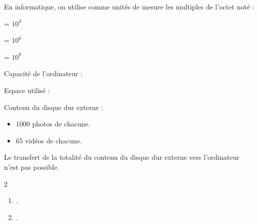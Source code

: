 \begin{exercice*}
    En informatique, on utilise comme unités de mesure les multiples de l'octet noté \Octet[o]{} :
    
    \begin{minipage}{0.24\textwidth}
         = $10^3$ \Octet[o]{}

         = $10^6$ \Octet[o]{}

         = $10^9$ \Octet[o]{}
    \end{minipage}
    \begin{minipage}{0.24\textwidth}
        Capacité de l'ordinateur : 

        Espace utilisé :         
    \end{minipage}

    Contenu du disque dur externe :
    \begin{itemize}
        \item $\num{1000}$ photos de  chacune.
        \item $65$ vidéos de  chacune.
    \end{itemize}

    Le transfert de la totalité du contenu du disque dur externe
    vers l'ordinateur n'est pas possible.
\end{exercice*}
\begin{corrige}
    \phantom{rrr}    
    \begin{multicols}2
        \begin{enumerate}
            \item .
            \item .
        \end{enumerate}
    \end{multicols}
\end{corrige}

